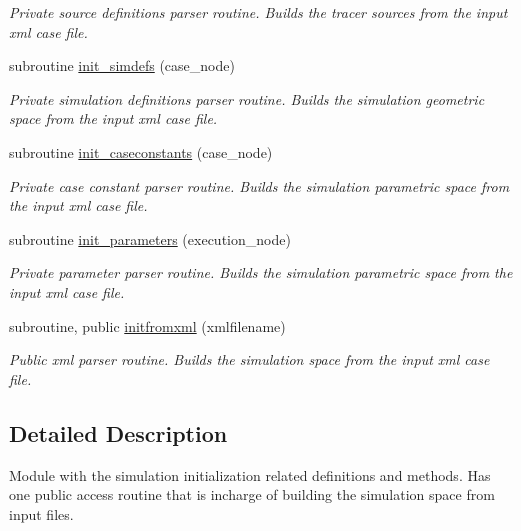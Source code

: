 \begin{DoxyCompactItemize}
\begin{DoxyCompactList}\small\item\em Private source definitions parser routine. Builds the tracer sources from the input xml case file. \end{DoxyCompactList}\item 
subroutine \mbox{\hyperlink{namespacesimulation__initialize__mod_ae4a495136e5f02724a5cc456d5884281}{init\+\_\+simdefs}} (case\+\_\+node)
\begin{DoxyCompactList}\small\item\em Private simulation definitions parser routine. Builds the simulation geometric space from the input xml case file. \end{DoxyCompactList}\item 
subroutine \mbox{\hyperlink{namespacesimulation__initialize__mod_a97705c918360827c6fc76170b5eeb9bb}{init\+\_\+caseconstants}} (case\+\_\+node)
\begin{DoxyCompactList}\small\item\em Private case constant parser routine. Builds the simulation parametric space from the input xml case file. \end{DoxyCompactList}\item 
subroutine \mbox{\hyperlink{namespacesimulation__initialize__mod_a4ee29d81788bb77840a67af18784da66}{init\+\_\+parameters}} (execution\+\_\+node)
\begin{DoxyCompactList}\small\item\em Private parameter parser routine. Builds the simulation parametric space from the input xml case file. \end{DoxyCompactList}\item 
subroutine, public \mbox{\hyperlink{namespacesimulation__initialize__mod_aa596874d438807298121982eaa129d3a}{initfromxml}} (xmlfilename)
\begin{DoxyCompactList}\small\item\em Public xml parser routine. Builds the simulation space from the input xml case file. \end{DoxyCompactList}\end{DoxyCompactItemize}


\subsection{Detailed Description}
Module with the simulation initialization related definitions and methods. Has one public access routine that is incharge of building the simulation space from input files. 

